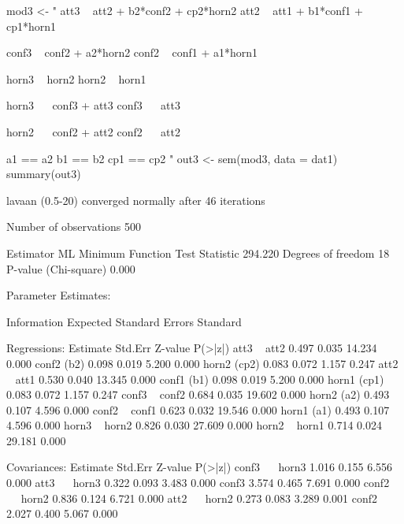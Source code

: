 \begin{Schunk}
\begin{Sinput}
 mod3 <- "
 att3 ~ att2 + b2*conf2 + cp2*horn2
 att2 ~ att1 + b1*conf1 + cp1*horn1
 
 conf3 ~ conf2 + a2*horn2
 conf2 ~ conf1 + a1*horn1
 
 horn3 ~ horn2
 horn2 ~ horn1
 
 horn3 ~~ conf3 + att3
 conf3 ~~ att3
 
 horn2 ~~ conf2 + att2
 conf2 ~~ att2
 
 a1 == a2
 b1 == b2
 cp1 == cp2
 "
 out3 <- sem(mod3, data = dat1)
 summary(out3)
\end{Sinput}
\begin{Soutput}
lavaan (0.5-20) converged normally after  46 iterations

  Number of observations                           500

  Estimator                                         ML
  Minimum Function Test Statistic              294.220
  Degrees of freedom                                18
  P-value (Chi-square)                           0.000

Parameter Estimates:

  Information                                 Expected
  Standard Errors                             Standard

Regressions:
                   Estimate  Std.Err  Z-value  P(>|z|)
  att3 ~                                              
    att2              0.497    0.035   14.234    0.000
    conf2     (b2)    0.098    0.019    5.200    0.000
    horn2    (cp2)    0.083    0.072    1.157    0.247
  att2 ~                                              
    att1              0.530    0.040   13.345    0.000
    conf1     (b1)    0.098    0.019    5.200    0.000
    horn1    (cp1)    0.083    0.072    1.157    0.247
  conf3 ~                                             
    conf2             0.684    0.035   19.602    0.000
    horn2     (a2)    0.493    0.107    4.596    0.000
  conf2 ~                                             
    conf1             0.623    0.032   19.546    0.000
    horn1     (a1)    0.493    0.107    4.596    0.000
  horn3 ~                                             
    horn2             0.826    0.030   27.609    0.000
  horn2 ~                                             
    horn1             0.714    0.024   29.181    0.000

Covariances:
                   Estimate  Std.Err  Z-value  P(>|z|)
  conf3 ~~                                            
    horn3             1.016    0.155    6.556    0.000
  att3 ~~                                             
    horn3             0.322    0.093    3.483    0.000
    conf3             3.574    0.465    7.691    0.000
  conf2 ~~                                            
    horn2             0.836    0.124    6.721    0.000
  att2 ~~                                             
    horn2             0.273    0.083    3.289    0.001
    conf2             2.027    0.400    5.067    0.000


\end{Soutput}
\end{Schunk}
